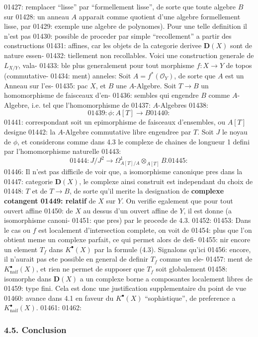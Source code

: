 01427: remplacer ``lisse'' par ``formellement lisse'', de sorte que toute algebre $B$ sur
01428: un anneau $A$ apparait comme quotient d'une algebre formellement lisse, par
01429: exemple une algebre de polynomes). Pour une telle definition il n'est pas
01430: possible de proceder par simple ``recollement'' a partir des constructions
01431: affines, car les objets de la categorie derivee $\mathbf{D}(X)$ sont de nature essen-
01432: tiellement non recollables. Voici une construction generale de $L_{X/Y}$, vala-
01433: ble plus generalement pour tout morphisme $f: X \to Y$ de topos (commutative-
01434: ment) anneles: Soit $A = f^{*}(\mathcal{O}_Y)$, de sorte que $A$ est un Anneau sur l'es-
01435: pac $X$, et $B$ une $A$-Algebre. Soit $T \to B$ un homomorphisme de faisceaux d'en-
01436: sembles qui engendre $B$ comme $A$-Algebre, i.e. tel que l'homomorphisme de
01437: $A$-Algebres
01438: \[
01439: \phi: A[T] \longrightarrow B
01440: \]
01441: correspondant soit un epimorphisme de faisceaux d'ensembles, ou $A[T]$ designe
01442: la $A$-Algebre commutative libre engendree par $T$. Soit $J$ le noyau de $\phi$, et considerons comme dans 4.3 le complexe de chaines de longueur 1 defini par l'homomorphisme naturelle
01443: \[
01444: J/J^2 \longrightarrow \Omega^1_{A[T]/A} \otimes_{A[T]} B.
01445: \]
01446: Il n'est pas difficile de voir que, a isomorphisme canonique pres dans la
01447: categorie $\mathbf{D}(X)$, le complexe ainsi construit est independant du choix de
01448: $T$ et de $T \to B$, de sorte qu'il merite la designation de \textbf{complexe cotangent
01449: relatif} de $X$ sur $Y$. On verifie egalement que pour tout ouvert affine
01450: de $X$ au dessus d'un ouvert affine de $Y$, il est donne (a isomorphisme canoni-
01451: que pres) par le procede de 4.3.
01452: 
01453: Dans le cas ou $f$ est localement d'intersection complete, on voit de
01454: plus que l'on obtient meme un complexe parfait, ce qui permet alors de defi-
01455: nir encore un element $T_f$ dans $K^{\bullet}(X)$ par la formule (4.3). Signalons qu'ici
01456: encore, il n'aurait pas ete possible en general de definir $T_f$ comme un ele-
01457: ment de $K^{\bullet}_{\text{naif}}(X)$, et rien ne permet de supposer que $T_f$ soit globalement
01458: isomorphe dans $\mathbf{D}(X)$ a un complexe borne a composantes localement libres de
01459: type fini. Cela est donc une justification supplementaire du point de vue
01460: avance dans 4.1 en faveur du $K^{\bullet}(X)$ ``sophistique'', de preference a $K^{\bullet}_{\text{naif}}(X)$.
01461: 
01462: \subsubsection*{4.5. Conclusion}
